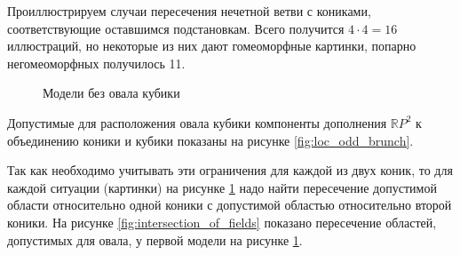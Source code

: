 \documentclass[11pt]{article}
\begin{document}
Проиллюстрируем случаи пересечения нечетной ветви с кониками, соответствующие оставшимся подстановкам. Всего получится $4 \cdot 4 = 16$ иллюстраций, но некоторые из них дают гомеоморфные картинки, попарно негомеоморфных получилось 11. 

\begin{figure}[H]
\caption{Модели без овала кубики}
\label{fig:curves_without_ovals}
\end{figure}

Допустимые для расположения овала кубики компоненты дополнения $\mathbb RP^2$ к объединению коники и кубики показаны на рисунке \ref{fig:loc_odd_brunch}.

Так как необходимо учитывать эти ограничения для каждой из двух коник, то для каждой ситуации (картинки) на рисунке \ref{fig:curves_without_ovals} надо найти пересечение допустимой области относительно одной коники с допустимой областью относительно второй коники. На рисунке \ref{fig:intersection_of_fields} показано пересечение областей, допустимых для овала, у первой модели на рисунке \ref{fig:curves_without_ovals}.
\end{document}
